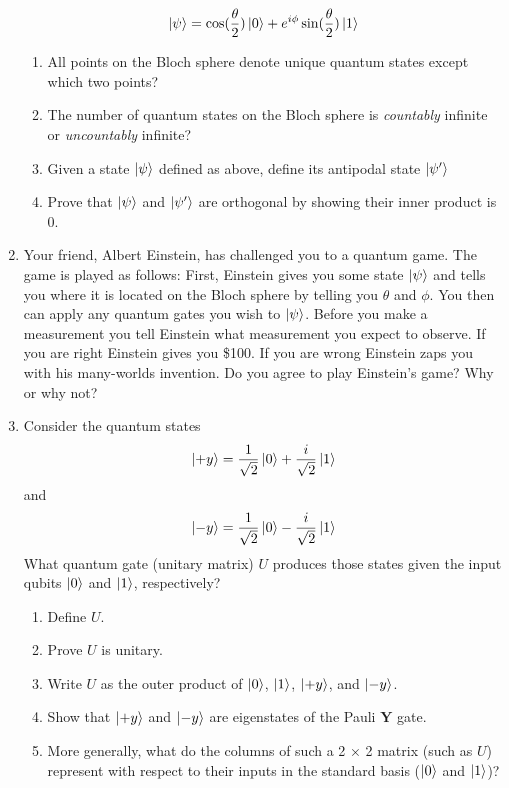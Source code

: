 \documentclass[12pt]{article}
\begin{document}
\begin{enumerate}[font=\bfseries]
    \[\ket{\psi} = \cos(\frac{\theta}{2})\ket{0}
    + e^{i\phi}\sin(\frac{\theta}{2})\ket{1}\]
    \begin{enumerate}
        \item All points on the Bloch sphere denote unique quantum states except which two points?
        \item The number of quantum states on the Bloch sphere is \emph{countably} infinite or \emph{uncountably} infinite?
        \item Given a state $\ket{\psi}$ defined as above, define its antipodal state $\ket{\psi'}$
        \item Prove that $\ket{\psi}$ and $\ket{\psi'}$ are orthogonal by showing their inner product is 0.
    \end{enumerate}
    \item Your friend, Albert Einstein, has challenged you to a quantum game. The game is played as follows: First, Einstein gives you some state $\ket{\psi}$ and tells you where it is located on the Bloch sphere by telling you $\theta$ and $\phi$. You then can apply any quantum gates you wish to $\ket{\psi}$. Before you make a measurement you tell Einstein what measurement you expect to observe. If you are right Einstein gives you \$100. If you are wrong Einstein zaps you with his many-worlds invention. Do you agree to play Einstein's game? Why or why not?
    \item Consider the quantum states
        \[\ket{+y} = \frac{1}{\sqrt{2}}\ket{0} + \frac{i}{\sqrt{2}}\ket{1}\]
        and
        \[\ket{-y} = \frac{1}{\sqrt{2}}\ket{0} - \frac{i}{\sqrt{2}}\ket{1}\]
        What quantum gate (unitary matrix) $U$ produces those states given the input qubits $\ket{0}$ and $\ket{1}$, respectively?
        \begin{enumerate}
            \item Define $U$.
            \item Prove $U$ is unitary.
            \item Write $U$ as the outer product of $\ket{0}$, $\ket{1}$, $\ket{+y}$, and $\ket{-y}$.
            \item Show that $\ket{+y}$ and $\ket{-y}$ are eigenstates of the Pauli $\mathbf{Y}$ gate.
            \item More generally, what do the columns of such a 2 × 2 matrix (such as $U$) represent with respect to their inputs in the standard basis ($\ket{0}$ and $\ket{1}$)?
        \end{enumerate}
\end{enumerate}
\end{document}
